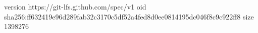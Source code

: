 version https://git-lfs.github.com/spec/v1
oid sha256:ff632419e96d289fab32c3170c5df52a4fed8d0ee0814195dc046f8c9c922ff8
size 1398276
